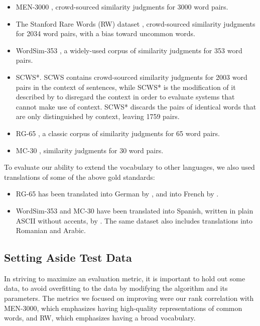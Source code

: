 \documentclass[11pt,letterpaper]{article}
\begin{document}
\begin{itemize}
\item MEN-3000 \cite{bruni2014men}, crowd-sourced similarity judgments for 3000
    word pairs.
\item The Stanford Rare Words (RW) dataset \cite{luong2013rw}, crowd-sourced
    similarity judgments for 2034 word pairs, with a bias toward uncommon words.
\item WordSim-353 \cite{finkelstein2001ws}, a widely-used corpus of similarity
    judgments for 353 word pairs.
\item SCWS*. SCWS \cite{huang2012scws} contains crowd-sourced similarity
    judgments for 2003 word pairs in the context of sentences, while SCWS* is
    the modification of it described by 
    to disregard the context in order to evaluate
    systems that cannot make use of context. SCWS* discards the pairs of
    identical words that are only distinguished by context, leaving 1759 pairs.
\item RG-65 \cite{rubenstein1965rg}, a classic corpus of similarity judgments
    for 65 word pairs.
\item MC-30 \cite{miller1991mc}, similarity judgments for 30 word pairs.
\end{itemize}

To evaluate our ability to extend the vocabulary to other languages, we also
used translations of some of the above gold standards:

\begin{itemize}
\item RG-65 has been translated into German by ,
    and into French by .
\item WordSim-353 and MC-30 have been translated into Spanish, written in
    plain ASCII without accents, by . The
    same dataset also includes translations into Romanian and Arabic.
\end{itemize}

\subsection{Setting Aside Test Data}

In striving to maximize an evaluation metric, it is important to hold out some
data, to avoid overfitting to the data by modifying the algorithm and its
parameters. The metrics we focused on improving were our rank correlation with
MEN-3000, which emphasizes having high-quality representations of common words,
and RW, which emphasizes having a broad vocabulary.
\end{document}
